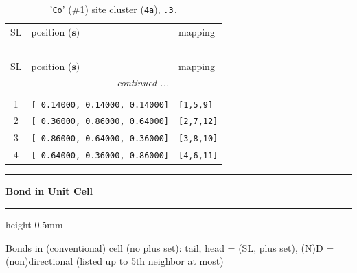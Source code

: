 \documentclass[fleqn,10pt,landscape]{jsarticle}
\begin{document}
\renewcommand{\arraystretch}{1.6}
\begin{longtable}[l]{cll}
\captionsetup{justification=raggedright, singlelinecheck=off}
\caption{'\texttt{Co}' (\#1) site cluster (\texttt{4a}), \texttt{.3.}}
 \\
 \hline \hline
SL & position ($\bm{s})$ & mapping \\ \hline \endfirsthead

\multicolumn{2}{l}{\tablename\ \thetable{}} \\
 \hline \hline
SL & position ($\bm{s})$ & mapping \\ \hline \endhead

 \hline \hline
\multicolumn{2}{r}{\footnotesize\it continued ...} \\ \endfoot

 \hline \hline
\multicolumn{2}{r}{} \\ \endlastfoot

1 & \texttt{[ 0.14000, 0.14000, 0.14000]} & \texttt{[1,5,9]} \\ \hline
2 & \texttt{[ 0.36000, 0.86000, 0.64000]} & \texttt{[2,7,12]} \\ \hline
3 & \texttt{[ 0.86000, 0.64000, 0.36000]} & \texttt{[3,8,10]} \\ \hline
4 & \texttt{[ 0.64000, 0.36000, 0.86000]} & \texttt{[4,6,11]} \\
\end{longtable}
\vspace{5mm}
\noindent \rule[0.5mm]{5mm}{0.5mm}\hspace{3mm}\textbf{Bond in Unit Cell}\hspace{3mm}\leaders\hrule height 0.5mm\hfill\kern0pt
\vspace{3mm}

\noindent Bonds in (conventional) cell (no plus set): tail, head = (SL, plus set), (N)D = (non)directional (listed up to 5th neighbor at most)
\end{document}
